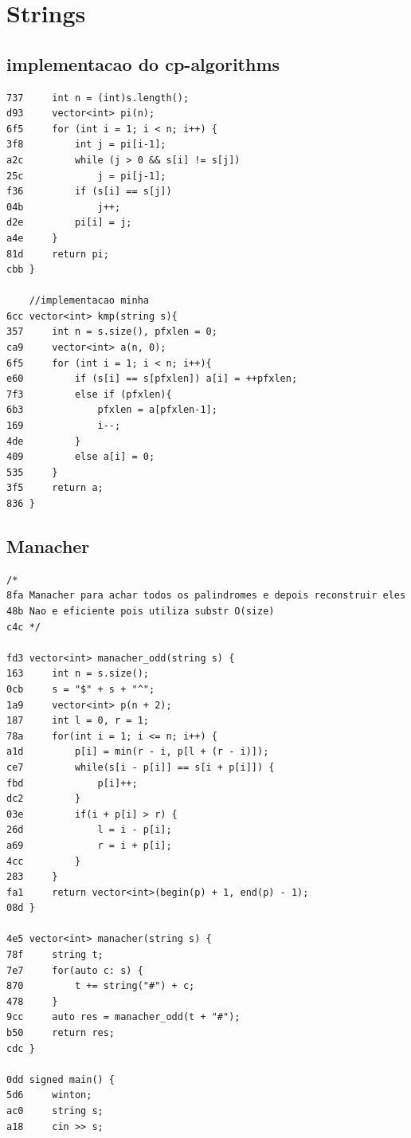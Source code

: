 \documentclass[11pt, a4paper, twoside]{article}
\begin{document}
{%
%
%

\section{Strings}

\subsection{implementacao do cp-algorithms}
\begin{lstlisting}
737     int n = (int)s.length();
d93     vector<int> pi(n);
6f5     for (int i = 1; i < n; i++) {
3f8         int j = pi[i-1];
a2c         while (j > 0 && s[i] != s[j])
25c             j = pi[j-1];
f36         if (s[i] == s[j])
04b             j++;
d2e         pi[i] = j;
a4e     }
81d     return pi;
cbb }
    
    //implementacao minha
6cc vector<int> kmp(string s){
357     int n = s.size(), pfxlen = 0;
ca9     vector<int> a(n, 0);
6f5     for (int i = 1; i < n; i++){
e60         if (s[i] == s[pfxlen]) a[i] = ++pfxlen;
7f3         else if (pfxlen){
6b3             pfxlen = a[pfxlen-1];
169             i--;
4de         }
409         else a[i] = 0;
535     }
3f5     return a;
836 }
\end{lstlisting}

\subsection{Manacher}
\begin{lstlisting}
/*
8fa Manacher para achar todos os palindromes e depois reconstruir eles
48b Nao e eficiente pois utiliza substr O(size)
c4c */

fd3 vector<int> manacher_odd(string s) {
163     int n = s.size();
0cb     s = "$" + s + "^";
1a9     vector<int> p(n + 2);
187     int l = 0, r = 1;
78a     for(int i = 1; i <= n; i++) {
a1d         p[i] = min(r - i, p[l + (r - i)]);
ce7         while(s[i - p[i]] == s[i + p[i]]) {
fbd             p[i]++;
dc2         }
03e         if(i + p[i] > r) {
26d             l = i - p[i];
a69             r = i + p[i];
4cc         }
283     }
fa1     return vector<int>(begin(p) + 1, end(p) - 1);
08d }

4e5 vector<int> manacher(string s) {
78f     string t;
7e7     for(auto c: s) {
870         t += string("#") + c;
478     }
9cc     auto res = manacher_odd(t + "#");
b50     return res;
cdc }

0dd signed main() {
5d6     winton;
ac0     string s;
a18     cin >> s;
    

\end{lstlisting}}
\end{document}
